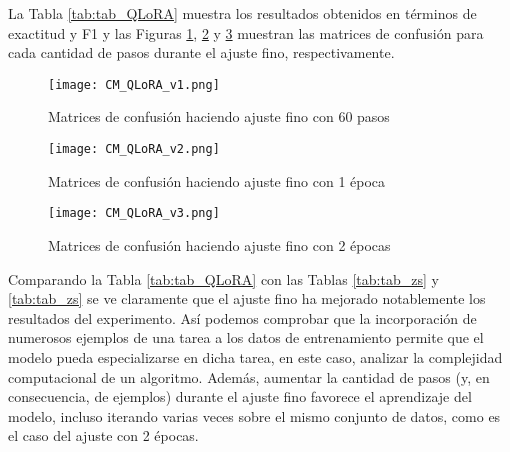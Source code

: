 \documentclass[12pt,twoside]{article}
\begin{document}
La Tabla \ref{tab:tab_QLoRA} muestra los resultados obtenidos en términos de exactitud y F1 y las Figuras \ref{fig:confmat_QLoRA1}, \ref{fig:confmat_QLoRA2} y \ref{fig:confmat_QLoRA3} muestran las matrices de confusión para cada cantidad de pasos durante el ajuste fino, respectivamente.

\begin{table}[H]
    \centering
    \caption{Exactitud de la predicción de las clases de complejidad haciendo ajuste fino}
    \label{tab:tab_QLoRA}
\end{table}

\begin{figure}[H]
  \centering
    \texttt{[image: CM\_QLoRA\_v1.png]}
  \caption{Matrices de confusión haciendo ajuste fino con 60 pasos}
  \label{fig:confmat_QLoRA1}
\end{figure}

\begin{figure}[H]
  \centering
    \texttt{[image: CM\_QLoRA\_v2.png]}
  \caption{Matrices de confusión haciendo ajuste fino con 1 época}
  \label{fig:confmat_QLoRA2}
\end{figure}

\begin{figure}[H]
  \centering
    \texttt{[image: CM\_QLoRA\_v3.png]}
  \caption{Matrices de confusión haciendo ajuste fino con 2 épocas}
  \label{fig:confmat_QLoRA3}
\end{figure}

Comparando la Tabla \ref{tab:tab_QLoRA} con las Tablas \ref{tab:tab_zs} y \ref{tab:tab_zs} se ve claramente que el ajuste fino ha mejorado notablemente los resultados del experimento. Así podemos comprobar que la incorporación de numerosos ejemplos de una tarea a los datos de entrenamiento permite que el modelo pueda especializarse en dicha tarea, en este caso, analizar la complejidad computacional de un algoritmo. Además, aumentar la cantidad de pasos (y, en consecuencia, de ejemplos) durante el ajuste fino favorece el aprendizaje del modelo, incluso iterando varias veces sobre el mismo conjunto de datos, como es el caso del ajuste con 2 épocas.
\end{document}
